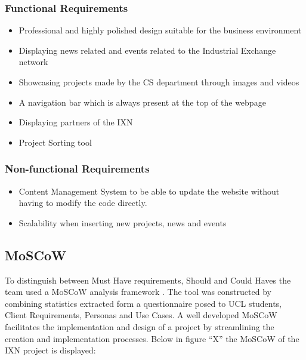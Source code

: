 \documentclass[fontsize=10pt]{extarticle}
\numberwithin{figure}{section} %
\providecommand{\tightlist}{%
  \setlength{\itemsep}{0pt}\setlength{\parskip}{0pt}}
\begin{document}
\hypertarget{functional-requirements}{%
\subsubsection{Functional Requirements}\label{functional-requirements}}

\begin{itemize}
\tightlist
\item
  Professional and highly polished design suitable for the business
  environment
\item
  Displaying news related and events related to the Industrial Exchange
  network
\item
  Showcasing projects made by the CS department through images and
  videos
\item
  A navigation bar which is always present at the top of the webpage
\item
  Displaying partners of the IXN
\item
  Project Sorting tool
\end{itemize}

\hypertarget{non-functional-requirements}{%
\subsubsection{Non-functional
Requirements}\label{non-functional-requirements}}

\begin{itemize}
\tightlist
\item
  Content Management System to be able to update the website without
  having to modify the code directly.
\item
  Scalability when inserting new projects, news and events
\end{itemize}

\hypertarget{moscow}{%
\subsection{MoSCoW}\label{moscow}}

To distinguish between Must Have requirements, Should and Could Haves
the team used a MoSCoW analysis framework \cite{g4}. The tool was
constructed by combining statistics extracted form a questionnaire posed
to UCL students, Client Requirements, Personas and Use Cases. A well
developed MoSCoW facilitates the implementation and design of a project
by streamlining the creation and implementation processes. Below in
figure ``X'' the MoSCoW of the IXN project is displayed:
\end{document}
